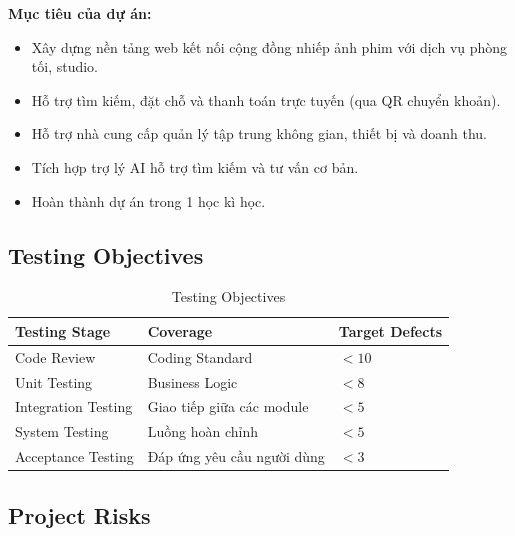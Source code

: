 \textbf{Mục tiêu của dự án:}

\begin{itemize}
	\item Xây dựng nền tảng web kết nối cộng đồng nhiếp ảnh phim với dịch vụ phòng tối, studio.
	\item Hỗ trợ tìm kiếm, đặt chỗ và thanh toán trực tuyến (qua QR chuyển khoản).
	\item Hỗ trợ nhà cung cấp quản lý tập trung không gian, thiết bị và doanh thu.
	\item Tích hợp trợ lý AI hỗ trợ tìm kiếm và tư vấn cơ bản.
	\item Hoàn thành dự án trong 1 học kì học.
\end{itemize}


\subsection{Testing Objectives}

\begin{table}[H]
	\centering
	\small
	\caption{Testing Objectives}
	\begin{tabularx}{\textwidth}{|L{3.5cm}|Y|L{3cm}|}
		\hline
		\textbf{Testing Stage} & \textbf{Coverage} & \textbf{Target Defects} \\ \hline
		Code Review & Coding Standard & $<10$ \\ \hline
		Unit Testing & Business Logic & $<8$ \\ \hline
		Integration Testing & Giao tiếp giữa các module & $<5$ \\ \hline
		System Testing & Luồng hoàn chỉnh & $<5$ \\ \hline
		Acceptance Testing & Đáp ứng yêu cầu người dùng & $<3$ \\ \hline
	\end{tabularx}
\end{table}


\subsection{Project Risks}

